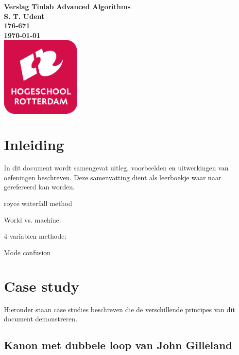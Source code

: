 \documentclass{article}
\begin{document}
\sffamily



\begin{titlepage}
  \centering
    \vfill
    {\bfseries\Huge
      Verslag Tinlab Advanced Algorithms \\
        \vskip2cm
      }
      {\bfseries\Large
        S. T. Udent\\
      }
      {
        \bfseries\normalsize
        176-671\\
        \vskip1cm
        \today\\
    }    
    \vfill
    \includegraphics[width=4cm]{logohr.png} %
    \vfill
    \vfill
\end{titlepage}
\newpage
\tableofcontents

\newpage
\section{Inleiding}
In dit document wordt samengevat uitleg, voorbeelden en uitwerkingen van oefeningen beschreven. Deze samenvatting dient als leerboekje waar naar gerefereerd kan worden. 


royce waterfall method






World vs. machine:



4 variablen methode:


Mode confusion 




\section{Case study}
Hieronder staan case studies beschreven die de verschillende principes van dit document demonstreren.

\subsection{Kanon met dubbele loop van John Gilleland}
\end{document}
